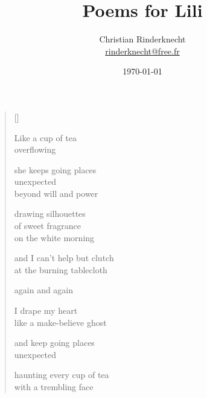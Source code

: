 \documentclass[12pt,a4paper]{article}
\title{Poems for Lili}
\author{Christian Rinderknecht\\
{\small \url{rinderknecht@free.fr}}}
\date{\today}
\begin{document}

\thispagestyle{empty}

\poemtitle{}

\settowidth{\versewidth}{Like a make-believe ghost}

\bigskip

\begin{verse}[\versewidth]

Like a cup of tea \\
overflowing

she keeps going places \\
unexpected \\
beyond will and power

drawing silhouettes \\
of sweet fragrance \\
on the white morning

and I can't help but clutch \\
at the burning tablecloth

again and again

I drape my heart \\
like a make-believe ghost

and keep going places \\
unexpected

haunting every cup of tea \\
with a trembling face
\end{verse}
\end{document}
